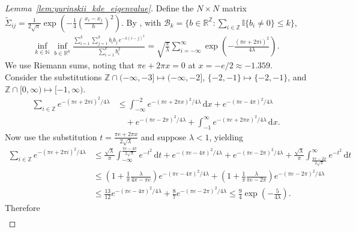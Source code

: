\documentclass[11pt,lof]{puthesis}
\newcommand{\N}{\ensuremath{\mathbb{N}}}
\newcommand{\R}{\ensuremath{\mathbb{R}}}
\newcommand{\I}{\ensuremath{\mathbb{I}}}
\newcommand{\Z}{\ensuremath{\mathbb{Z}}}
\newcommand{\cB}{\ensuremath{\mathcal{B}}}
\newcommand{\diff}[1]{\,\mathrm{d}#1}
\theoremstyle{break}
\theoremstyle{proof}
\newtheorem{proof}{Proof}
\begin{document}
\begin{proof}[Lemma~\ref{lem:yurinskii_kde_eigenvalue}]
  Define the $N \times N$ matrix
  $\tilde\Sigma_{i j} = \frac{1}{2 \sqrt \pi}
  \exp \left( - \frac{1}{4} \left( \frac{x_i-x_j}{h} \right)^2 \right)$.
  By \citet[Proposition~2.4,
  Proposition~2.5, and Equation~2.10]{baxter1994norm},
  with $\cB_k = \big\{b \in \R^\Z :
  \sum_{i \in \Z} \I\{b_i \neq 0\} \leq k \big\}$,
  \begin{align*}
    \inf_{k \in \N}
    \inf_{b \in \R^k}
    \frac{\sum_{i=1}^k \sum_{j=1}^k b_i b_j \, e^{-\lambda(i-j)^2}}
    {\sum_{i=1}^k b_i^2}
    =
    \sqrt{\frac{\pi}{\lambda}}
    \sum_{i=-\infty}^{\infty}
    \exp \left( - \frac{(\pi e + 2 \pi i)^2}{4 \lambda} \right).
  \end{align*}
  We use Riemann sums,
  noting that $\pi e + 2 \pi x = 0$ at
  $x = -e/2 \approx -1.359$.
  Consider the substitutions
  $\Z \cap (-\infty, -3] \mapsto (-\infty, -2]$,
  $\{-2, -1\} \mapsto \{-2, -1\}$, and
  $\Z \cap [0, \infty) \mapsto [-1, \infty)$.
  \begin{align*}
    \sum_{i \in \Z}
    e^{-(\pi e + 2 \pi i)^2 / 4 \lambda}
    &\leq
    \int_{-\infty}^{-2}
    e^{ - (\pi e + 2 \pi x)^2/4 \lambda}
    \diff x
    + e^{- (\pi e - 4 \pi)^2/4 \lambda} \\
    &\quad+
    e^{ - (\pi e - 2 \pi)^2 / 4 \lambda}
    + \int_{-1}^{\infty}
    e^{ -(\pi e + 2 \pi x)^2 / 4 \lambda}
    \diff x.
  \end{align*}
  Now use the substitution $t = \frac{\pi e + 2 \pi x}{2 \sqrt \lambda}$
  and suppose $\lambda < 1$, yielding
  \begin{align*}
    \sum_{i \in \Z}
    e^{-(\pi e + 2 \pi i)^2 / 4 \lambda}
    &\leq
    \frac{\sqrt \lambda}{\pi}
    \int_{-\infty}^{\frac{\pi e - 4 \pi}{2 \sqrt \lambda}}
    e^{-t^2}
    \diff t
    + e^{- (\pi e - 4 \pi)^2/4 \lambda}
    + e^{ - (\pi e - 2 \pi)^2 / 4 \lambda}
    + \frac{\sqrt \lambda}{\pi}
    \int_{\frac{\pi e - 2 \pi}{2 \sqrt \lambda}}^{\infty}
    e^{-t^2}
    \diff t \\
    &\leq
    \left( 1 + \frac{1}{\pi} \frac{\lambda}{4 \pi - \pi e} \right)
    e^{-(\pi e - 4 \pi)^2 / 4 \lambda}
    +
    \left( 1 + \frac{1}{\pi} \frac{\lambda}{\pi e - 2 \pi} \right)
    e^{- (\pi e - 2 \pi)^2 / 4 \lambda} \\
    &\leq
    \frac{13}{12}
    e^{-(\pi e - 4 \pi)^2 / 4 \lambda}
    +
    \frac{8}{7}
    e^{- (\pi e - 2 \pi)^2 / 4 \lambda}
    \leq
    \frac{9}{4}
    \exp \left( - \frac{5}{4 \lambda} \right).
  \end{align*}
  Therefore
  \begin{align*}

\end{align*}
\end{proof}
\end{document}
